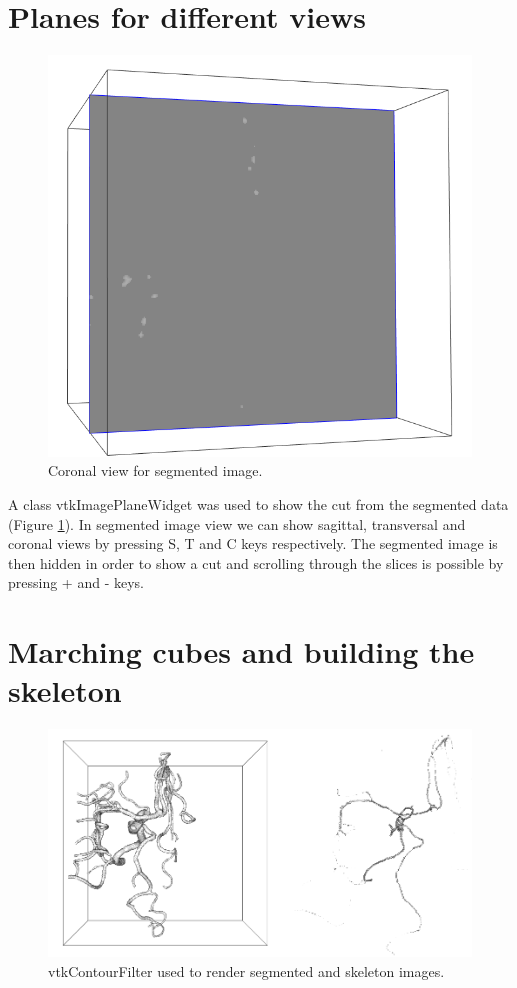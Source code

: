 \section{Planes for different views}

\begin{figure}
	\centering
	\includegraphics[scale=0.3]{fig/image-plane}
	\caption{Coronal view for segmented image.}
	\label{fig:image-plane}
\end{figure}

A class vtkImagePlaneWidget was used to show the cut from the segmented data (Figure \ref{fig:image-plane}). In segmented image view we can show sagittal, transversal and coronal views by pressing S, T and C keys respectively. The segmented image is then hidden in order to show a cut and scrolling through the slices is possible by pressing + and - keys.

\section{Marching cubes and building the skeleton}

\begin{figure}
	\centering
	\includegraphics[scale=0.6]{fig/segmented-skeleton}
	\caption{vtkContourFilter used to render segmented and skeleton images.}
	\label{fig:segmented-skeleton}
\end{figure}

